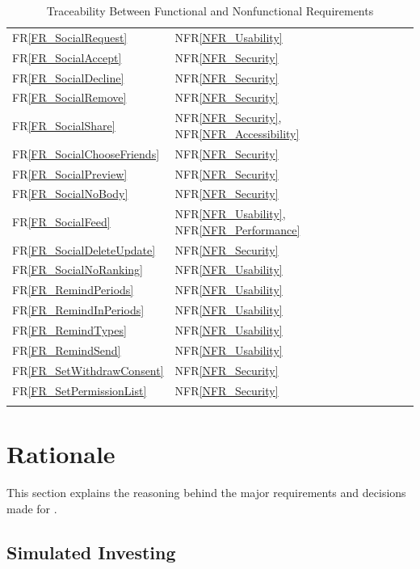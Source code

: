 \documentclass[12pt]{article}
\newcommand{\rref}[1]{FR\ref{#1}}
\newcommand{\nfrref}[1]{NFR\ref{#1}}
\begin{document}
\begin{longtable}{p{} p{}}
\rref{FR_SocialRequest} & \nfrref{NFR_Usability} \\
\rref{FR_SocialAccept} & \nfrref{NFR_Security} \\
\rref{FR_SocialDecline} & \nfrref{NFR_Security} \\
\rref{FR_SocialRemove} & \nfrref{NFR_Security} \\
\rref{FR_SocialShare} & \nfrref{NFR_Security}, \nfrref{NFR_Accessibility} \\
\rref{FR_SocialChooseFriends} & \nfrref{NFR_Security} \\
\rref{FR_SocialPreview} & \nfrref{NFR_Security} \\
\rref{FR_SocialNoBody} & \nfrref{NFR_Security} \\
\rref{FR_SocialFeed} & \nfrref{NFR_Usability}, \nfrref{NFR_Performance} \\
\rref{FR_SocialDeleteUpdate} & \nfrref{NFR_Security} \\
\rref{FR_SocialNoRanking} & \nfrref{NFR_Usability} \\


\rref{FR_RemindPeriods} & \nfrref{NFR_Usability} \\
\rref{FR_RemindInPeriods} & \nfrref{NFR_Usability} \\
\rref{FR_RemindTypes} & \nfrref{NFR_Usability} \\
\rref{FR_RemindSend} & \nfrref{NFR_Usability} \\
\rref{FR_SetWithdrawConsent} & \nfrref{NFR_Security} \\
\rref{FR_SetPermissionList} & \nfrref{NFR_Security} \\
\bottomrule
\caption{Traceability Between Functional and Nonfunctional Requirements}
\label{tab:FR2Rtm}

\end{longtable}



\section{Rationale} \label{SecRationale}

This section explains the reasoning behind the major requirements
and decisions made for \progname{}.

\subsection{Simulated Investing}
\end{document}
